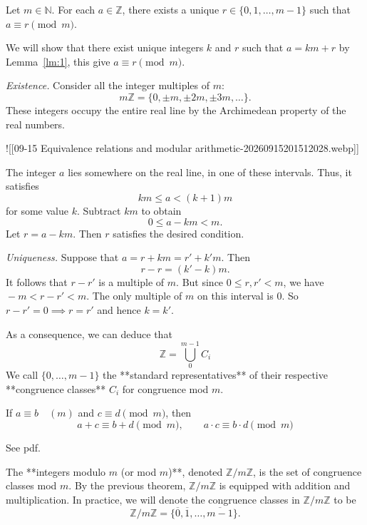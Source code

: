 \documentclass[12pt]{article}
\begin{document}
\begin{thm}
    Let ${}m \in \mathbb{N}{}$. For each ${} a \in \mathbb{Z}{}$, there exists a unique ${}r \in \{ 0,1,\dots,m-1 \}{}$ such that ${}a \equiv r \pmod{m}{}$.
\end{thm}
\begin{pf}
    We will show that there exist unique integers ${}k{}$ and ${}r{}$ such that ${}a= km +r{}$ by Lemma~\ref{lm:1}, this give ${}a \equiv r \pmod{m}{}$.

    \textit{Existence.} Consider all the integer multiples of ${}m{}$:\[
        m \mathbb{Z} = \{ 0,\pm m,\pm 2m,\pm 3m,\dots \}.
    \]
    These integers occupy the entire real line by the Archimedean property of the real numbers.

    ![[09-15 Equivalence relations and modular arithmetic-20260915201512028.webp]]

    The integer ${}a{}$ lies somewhere on the real line, in one of these intervals. Thus, it satisfies \[
        km \leq a < (k+1)m
    \]
    for some value ${}k{}$. Subtract ${}km{}$ to obtain \[
        0 \leq a-km < m.
    \]
    Let ${}r=a-km{}$. Then ${}r{}$ satisfies the desired condition.

    \textit{Uniqueness.} Suppose that ${}a=r+km=r'+k'm{}$. Then \[
        r -r = (k'-k)m.
    \]
    It follows that ${}r-r'{}$ is a multiple of ${}m{}$. But since ${}0 \leq r,r' < m{}$, we have ${}-m < r-r' < m{}$. The only multiple of ${}m{}$ on this interval is ${}0{}.$ So ${}r-r' = 0 \implies r=r'{}$ and hence ${}k=k'{}$.
\end{pf}

As a consequence, we can deduce that \[
    \mathbb{Z} = \bigcup_{0}^{m-1} C_{i}
\]
We call ${}\{0, \dots, m-1 \}{}$ the **standard representatives** of their respective **congruence classes** ${}C_{i}{}$ for congruence mod ${}m{}$.

\begin{thm} 
    If ${}a \equiv b \quad (m){}$ and ${}c \equiv d \pmod{m}{}$, then
    $$
    a+c\equiv b+d \pmod{m}, \qquad a \cdot c \equiv b \cdot d \pmod{m}
    $$
\end{thm}
\begin{pf}
    See pdf.
\end{pf}

\begin{defn}
    The **integers modulo $m$ (or mod $m$)**, denoted ${}\mathbb{Z}/m\mathbb{Z}{}$, is the set of congruence classes mod ${}m{}$. By the previous theorem, ${}\mathbb{Z} / m\mathbb{Z}{}$ is equipped with addition and multiplication. In practice, we will denote the congruence classes in ${}\mathbb{Z} / m \mathbb{Z}{}$ to be \[
        \mathbb{Z} / m \mathbb{Z} = \{ \overline{0}, \overline{1}, \dots, \overline{m-1}\}.
    \]
\end{defn}
\end{document}
